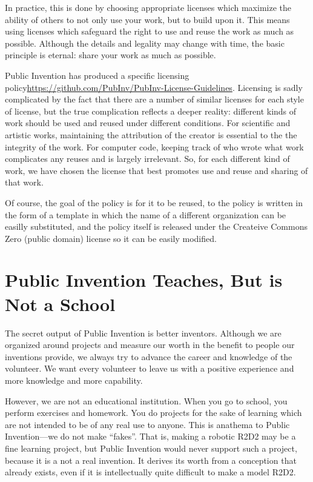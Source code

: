 \documentclass[
	fontsize=10pt, %
	twoside=false, %
	secnumdepth=1, %
]{kaobook}
\begin{document}
In practice, this is done by choosing appropriate licenses
which maximize the ability of others to not only use your work,
but to build upon it.
This means using licenses which safeguard the right to use and
reuse the work as much as possible.
Although the details and legality may change with time,
the basic principle is eternal: share your work as much as possible.

Public Invention has produced a specific licensing policy\url{https://github.com/PubInv/PubInv-License-Guidelines}.
Licensing is sadly complicated by the fact that there are a number of similar licenses for
each style of license,
but the true complication reflects a deeper reality: different kinds
of work should be used and reused under different conditions.
For scientific and artistic works, maintaining the attribution of the creator is essential
to the the integrity of the work.
For computer code, keeping track of who wrote what work complicates any reuses and
is largely irrelevant.
So, for each different kind of work, we have chosen the license that best promotes
use and reuse and sharing of that work.

Of course, the goal of the policy is for it to be reused, to the policy
is written in the form of a template in which the name of a different
organization can be easilly substituted, and the policy itself is released
under the Createive Commons Zero (public domain) license so it can be easily modified.

\section{Public Invention Teaches, But is Not a School}

The secret output of Public Invention is better inventors.
Although we are organized around projects and
measure our worth in the benefit to people our inventions provide,
we always try to advance the career and knowledge of the volunteer.
We want every volunteer to leave us with a positive experience
and more knowledge and more capability.

However, we are not an educational institution.
When you go to school, you perform exercises and homework.
You do projects for the sake of learning which are not
intended to be of any real use to anyone.
This is anathema to Public Invention---we do not make ``fakes''.
That is, making a robotic R2D2 may be a fine learning
project, but Public Invention would never support such
a project, because it is a not a real invention.
It derives its worth from a conception that already exists,
even if it is intellectually quite difficult to make a model R2D2.
\end{document}
